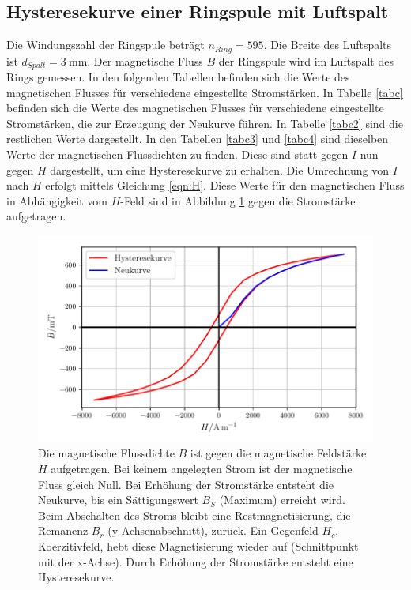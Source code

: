 \subsection{Hysteresekurve einer Ringspule mit Luftspalt}
Die Windungszahl der Ringspule beträgt $n_{Ring} = \num{595}$.
Die Breite des Luftspalts ist $d_{Spalt} = \SI{3}{\milli\meter}$.
\newline
Der magnetische Fluss $B$ der Ringspule wird im Luftspalt
des Rings gemessen.
In den folgenden Tabellen befinden sich die Werte des magnetischen
Flusses für verschiedene eingestellte Stromstärken.
In Tabelle \ref{tabc} befinden sich die Werte des magnetischen Flusses
für verschiedene eingestellte Stromstärken, die zur Erzeugung der Neukurve
führen. In Tabelle \ref{tabc2} sind die restlichen Werte dargestellt.
\newline
In den Tabellen \ref{tabc3} und \ref{tabc4} sind dieselben Werte der
magnetischen Flussdichten zu finden. Diese sind statt gegen $I$ nun
gegen $H$ dargestellt, um eine Hysteresekurve zu erhalten.
Die Umrechnung von $I$ nach $H$ erfolgt mittels Gleichung \eqref{eqn:H}.
\newline
Diese Werte für den magnetischen Fluss in Abhängigkeit vom
$H$-Feld sind in Abbildung \ref{plotc} gegen die Stromstärke aufgetragen.





\begin{figure}
    \centering
    \includegraphics{build/plotc.pdf}
    \caption{Die magnetische Flussdichte $B$ ist gegen die magnetische Feldstärke $H$
    aufgetragen. Bei keinem angelegten Strom ist der magnetische Fluss
    gleich Null. Bei Erhöhung der Stromstärke entsteht die Neukurve, bis
    ein Sättigungswert $B_{S}$ (Maximum) erreicht wird. Beim Abschalten des Stroms
    bleibt eine Restmagnetisierung, die Remanenz $B_{r}$ (y-Achsenabschnitt),
    zurück. Ein Gegenfeld $H_{c}$, Koerzitivfeld, hebt diese Magnetisierung wieder
    auf (Schnittpunkt mit der x-Achse). Durch Erhöhung der Stromstärke entsteht
    eine Hysteresekurve.}
    \label{plotc}
\end{figure}

